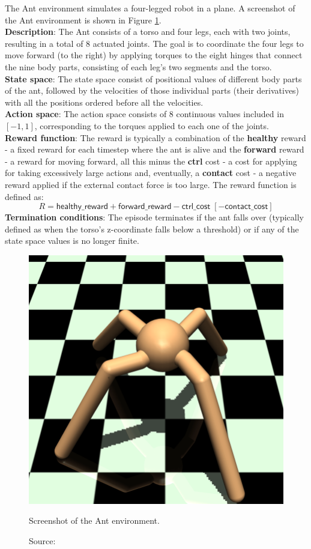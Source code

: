 The Ant environment \cite{antfarama} simulates a four-legged robot
in a plane. A screenshot of the Ant environment
is shown in Figure \ref{fig:ant}.\\
\textbf{Description}: The Ant consists of a torso and four legs, each with
two joints, resulting in a total of $8$ actuated joints.
The goal is to coordinate the four legs to move forward (to the right)
by applying torques to the eight hinges that connect the nine body parts,
consisting of each leg's two segments and the torso.\\
\textbf{State space}: The state space consist of positional values
of different body parts of the ant, followed by the velocities
of those individual parts (their derivatives)
with all the positions ordered before all the velocities.\\
\textbf{Action space}: The action space consists of $8$ continuous values
included in $[-1, 1]$,
corresponding to the torques applied to each one of the joints.\\
\textbf{Reward function}: The reward is typically a combination
of the \textbf{healthy} reward - a fixed reward for each timestep where
the ant is alive and the \textbf{forward} reward - a reward for moving
forward, all this minus the \textbf{ctrl} cost - a cost for applying
for taking excessively large actions and, eventually, a \textbf{contact}
cost - a negative reward applied if the external contact force is too large.
The reward function is defined as:
\begin{equation}
    R = \textsf{healthy\_reward} + \textsf{forward\_reward} - \textsf{ctrl\_cost} \;[- \textsf{contact\_cost}]
\end{equation}
\textbf{Termination conditions}: The episode terminates
if the ant falls over
(typically defined as when the torso's z-coordinate falls below a threshold)
or if any of the state space values is no longer finite.

\begin{figure}[h]
    \centering
    \includegraphics[width=.4\textwidth]{figures/ch4/ant.png}
    \caption{Screenshot of the Ant environment.}
    \vspace{-10px}
    \caption*{\scriptsize{Source: \cite{antpic}}}
    \label{fig:ant}
\end{figure}

